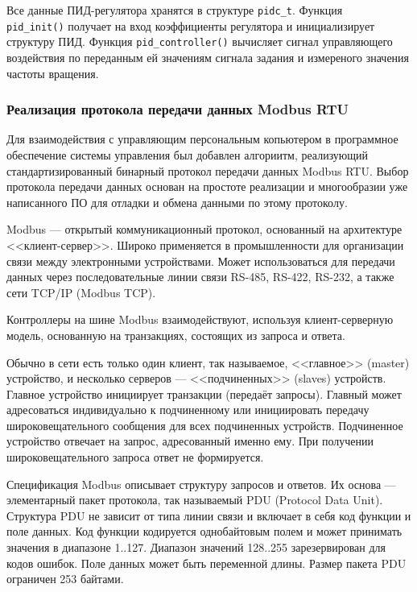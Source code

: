         Все данные ПИД-регулятора хранятся в структуре \verb"pidс_t". Функция\\
        \verb"pid_init()" получает на вход коэффициенты регулятора и
        инициализирует структуру ПИД. Функция \verb"pid_controller()" вычисляет
        сигнал управляющего воздействия по переданным ей значениям сигнала
        задания и измереного значения частоты вращения.

    \subsubsection{Реализация протокола передачи данных Modbus RTU}
        Для взаимодействия с управляющим персональным копьютером в программное
        обеспечение системы управления был добавлен алгориитм, реализующий
        стандартизированный бинарный протокол передачи данных Modbus RTU. Выбор
        протокола передачи данных основан на простоте реализации и многообразии
        уже написанного ПО для отладки и обмена данными по этому протоколу.

        Modbus — открытый коммуникационный протокол, основанный на архитектуре
        <<клиент-сервер>>. Широко применяется в промышленности для организации
        связи между электронными устройствами. Может использоваться для
        передачи данных через последовательные линии связи RS-485, RS-422,
        RS-232, а также сети TCP/IP (Modbus TCP).

        Контроллеры на шине Modbus взаимодействуют, используя клиент-серверную
        модель, основанную на транзакциях, состоящих из запроса и ответа.

        Обычно в сети есть только один клиент, так называемое, <<главное>> 
        (master) устройство, и несколько серверов — <<подчиненных>> (slaves)
        устройств. Главное устройство инициирует транзакции (передаёт запросы).
        Главный может адресоваться индивидуально к подчиненному или
        инициировать передачу широковещательного сообщения для всех подчиненных
        устройств. Подчиненное устройство отвечает на запрос, адресованный
        именно ему. При получении широковещательного запроса ответ не
        формируется.

        Спецификация Modbus описывает структуру запросов и ответов. Их основа —
        элементарный пакет протокола, так называемый PDU (Protocol Data Unit).
        Структура PDU не зависит от типа линии связи и включает в себя код
        функции и поле данных. Код функции кодируется однобайтовым полем и
        может принимать значения в диапазоне 1..127. Диапазон значений 128..255
        зарезервирован для кодов ошибок. Поле данных может быть переменной
        длины. Размер пакета PDU ограничен 253 байтами.

